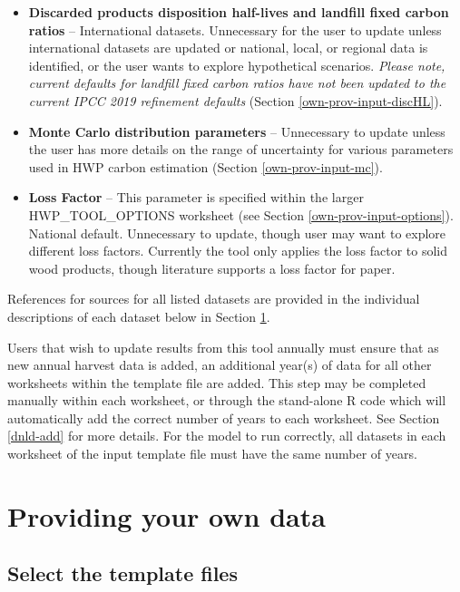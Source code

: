 \documentclass[
  openany]{book}
\begin{document}
\begin{itemize}
\item
  \textbf{Discarded products disposition half-lives and landfill fixed carbon ratios} -- International datasets. Unnecessary for the user to update unless international datasets are updated or national, local, or regional data is identified, or the user wants to explore hypothetical scenarios. \emph{Please note, current defaults for landfill fixed carbon ratios have not been updated to the current IPCC 2019 refinement defaults} (Section \ref{own-prov-input-discHL}).
\item
  \textbf{Monte Carlo distribution parameters} -- Unnecessary to update unless the user has more details on the range of uncertainty for various parameters used in HWP carbon estimation (Section \ref{own-prov-input-mc}).
\item
  \textbf{Loss Factor} -- This parameter is specified within the larger HWP\_TOOL\_OPTIONS worksheet (see Section \ref{own-prov-input-options}). National default. Unnecessary to update, though user may want to explore different loss factors. Currently the tool only applies the loss factor to solid wood products, though literature supports a loss factor for paper.
\end{itemize}

References for sources for all listed datasets are provided in the individual descriptions of each dataset below in Section \ref{own-prov}.

Users that wish to update results from this tool annually must ensure that as new annual harvest data is added, an additional year(s) of data for all other worksheets within the template file are added. This step may be completed manually within each worksheet, or through the stand-alone R code which will automatically add the correct number of years to each worksheet. See Section \ref{dnld-add} for more details. For the model to run correctly, all datasets in each worksheet of the input template file must have the same number of years.

\hypertarget{own-prov}{%
\section{Providing your own data}\label{own-prov}}

\hypertarget{own-prov-temp}{%
\subsection{Select the template files}\label{own-prov-temp}}
\end{document}
